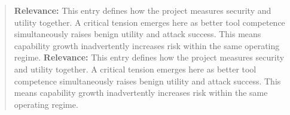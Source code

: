 \documentclass[11pt, a4paper]{article}
\begin{document}
\begin{quote}
\vspace{0.5em}
\enlargethispage{0.8\baselineskip}
\textbf{Relevance:} This entry defines how the project measures security and utility together. A critical tension emerges here as better tool competence simultaneously raises benign utility and attack success. This means capability growth inadvertently increases risk within the same operating regime.
\enlargethispage{0.8\baselineskip}
\textbf{Relevance:} This entry defines how the project measures security and utility together. A critical tension emerges here as better tool competence simultaneously raises benign utility and attack success. This means capability growth inadvertently increases risk within the same operating regime.
\end{quote}
\end{document}
